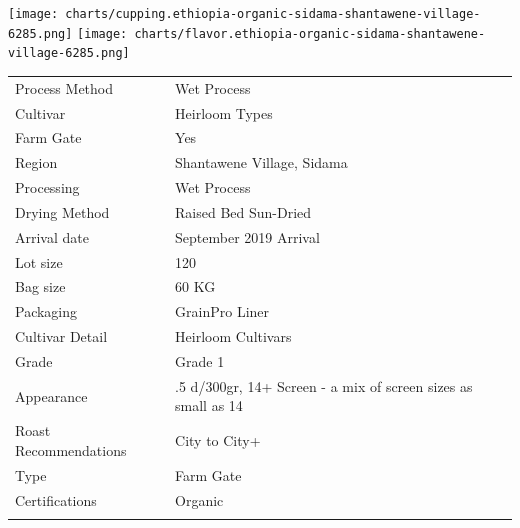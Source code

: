 \documentclass[10pt,twoside,footinclude=true,headinclude=true]{scrbook} %
\newlength{\mysize}
\newcommand{\myfontsize}[1]{
  \setlength{\mysize}{#1pt}
  \fontsize{\mysize}{1.2\mysize}
  \selectfont
}
\begin{document}
\centering
\vspace{2em}
\texttt{[image: charts/cupping.ethiopia-organic-sidama-shantawene-village-6285.png]}
\texttt{[image: charts/flavor.ethiopia-organic-sidama-shantawene-village-6285.png]}

\vspace{1em}
\begin{table}[htbp]
\myfontsize{7}
\hspace*{2.2em}
\begin{tabular}{ >{\raggedleft\arraybackslash}p{3.6cm}!{\color{lightgray}\vrule}p{7cm} }
\hline
  Process Method & Wet Process \\
  \hline
  Cultivar & Heirloom Types \\
  \hline
  Farm Gate & Yes \\
  \hline
  Region & Shantawene Village, Sidama \\
  \hline
  Processing & Wet Process \\
  \hline
  Drying Method & Raised Bed Sun-Dried \\
  \hline
  Arrival date & September 2019 Arrival \\
  \hline
  Lot size & 120 \\
  \hline
  Bag size & 60 KG \\
  \hline
  Packaging & GrainPro Liner \\
  \hline
  Cultivar Detail & Heirloom Cultivars \\
  \hline
  Grade & Grade 1 \\
  \hline
  Appearance & .5 d/300gr, 14+ Screen - a mix of screen sizes as small as 14 \\
  \hline
  Roast Recommendations & City to City+ \\
  \hline
  Type & Farm Gate \\
  \hline
  Certifications & Organic \\
  \hline

\end{tabular}
\end{table}

\end{document}
